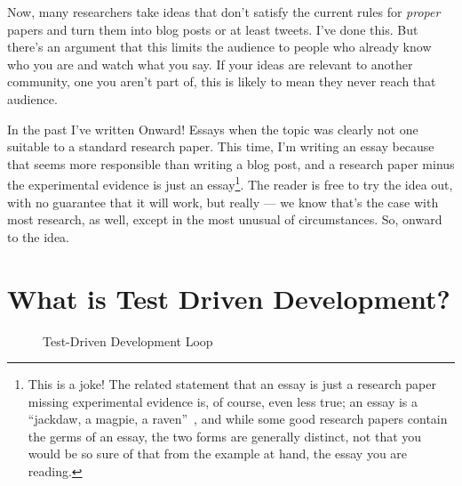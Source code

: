 \documentclass[sigplan,screen]{acmart}
\begin{document}
Now, many researchers take ideas that don't satisfy the current rules
for \emph{proper} papers and turn them into blog posts or at least
tweets.  I've done this.  But there's an argument that this limits the
audience to people who already know who you are and watch what you
say.  If your ideas are relevant to another community, one you aren't
part of, this is likely to mean they never reach that audience.

In the past I've written Onward! Essays when the topic was clearly not
one suitable to a standard research paper.  This time, I'm writing an
essay because that seems more responsible than writing a blog post,
and a research paper minus the experimental evidence is just an
essay\footnote{This is a joke!  The related statement that an essay is
  just a research paper missing experimental evidence is, of course,
  even less true; an essay is a ``jackdaw, a magpie, a
  raven''~\cite{doyleessay}, and while some good research papers contain the germs of
  an essay, the two forms are generally distinct, not that you would
  be so sure of that from the example at hand, the essay you are reading.}.  The reader is free to try the idea out, with no guarantee that
it will work, but really --- we know that's the case with most
research, as well, except in the most unusual of circumstances.  So,
onward to the idea.



\section{What is Test Driven Development?}

\begin{figure}[h!]
  \centering
  \caption{Test-Driven Development Loop}
  \label{fig:tdd}
\end{figure}
\end{document}
